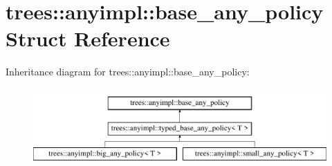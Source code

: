 \hypertarget{structtrees_1_1anyimpl_1_1base__any__policy}{}\section{trees\+:\+:anyimpl\+:\+:base\+\_\+any\+\_\+policy Struct Reference}
\label{structtrees_1_1anyimpl_1_1base__any__policy}
Inheritance diagram for trees\+:\+:anyimpl\+:\+:base\+\_\+any\+\_\+policy\+:\begin{figure}[H]
\begin{center}
\leavevmode
\includegraphics[height=3.000000cm]{structtrees_1_1anyimpl_1_1base__any__policy}
\end{center}
\end{figure}

